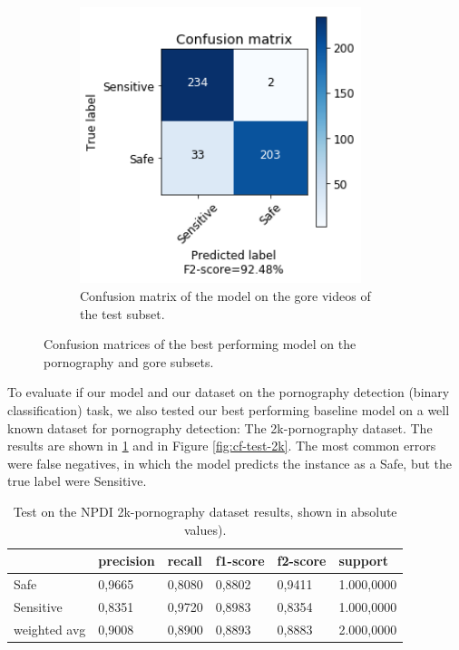 \begin{figure}[!ht]
\begin{subfigure}[b]{0.49\textwidth}
        \includegraphics[width=0.90\textwidth]{img/results/MLP-TEST-GORE.png}
        \caption{Confusion matrix of the model on the gore videos of the test subset.}
        \label{fig:cf-test-gore}
    \end{subfigure}
    \caption{Confusion matrices of the best performing model on the pornography and gore subsets.}
\end{figure}

To evaluate if our model and our dataset on the pornography detection (binary classification) task, we also tested our best performing baseline model on a well known dataset for pornography detection: The 2k-pornography dataset. The results are shown in \ref{tab:test-2k-results} and in Figure \ref{fig:cf-test-2k}. The most common errors were false negatives, in which the model predicts the instance as a Safe, but the true label were Sensitive.

\begin{table}[!ht]
\centering
\caption{Test on the NPDI 2k-pornography dataset results, shown in absolute values).}
\begin{tabular}{l|l|l|l|l|l}
             & precision & recall & f1-score & f2-score & support    \\ \hline
Safe         & 0,9665    & 0,8080 & 0,8802   & 0,9411   & 1.000,0000 \\ \hline
Sensitive    & 0,8351    & 0,9720 & 0,8983   & 0,8354   & 1.000,0000 \\ \hline
weighted avg & 0,9008    & 0,8900 & 0,8893   & 0,8883   & 2.000,0000
\end{tabular}
\label{tab:test-2k-results}
\end{table}

